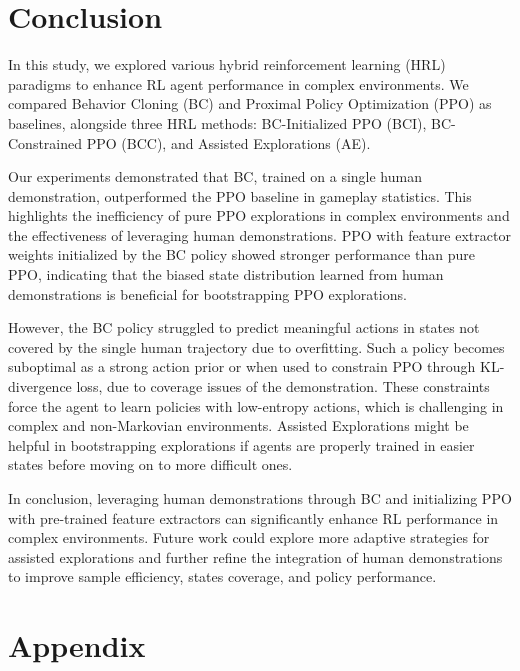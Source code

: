 \documentclass{article}
\begin{document}
\section{Conclusion}

In this study, we explored various hybrid reinforcement learning (HRL) 
paradigms to enhance RL agent performance in complex environments. We 
compared Behavior Cloning (BC) and Proximal Policy Optimization (PPO) 
as baselines, alongside three HRL methods: BC-Initialized PPO (BCI), 
BC-Constrained PPO (BCC), and Assisted Explorations (AE).

Our experiments demonstrated that BC, trained on a single human 
demonstration, outperformed the PPO baseline in gameplay statistics. 
This highlights the inefficiency of pure PPO explorations in complex 
environments and the effectiveness of leveraging human demonstrations. 
PPO with feature extractor weights initialized by the BC policy 
showed stronger performance than pure PPO, indicating that the biased 
state distribution learned from human demonstrations is beneficial 
for bootstrapping PPO explorations.

However, the BC policy struggled to predict meaningful actions in 
states not covered by the single human trajectory due to overfitting. 
Such a policy becomes suboptimal as a strong action prior or when 
used to constrain PPO through KL-divergence loss, due to coverage 
issues of the demonstration. These constraints force the agent to 
learn policies with low-entropy actions, which is challenging in 
complex and non-Markovian environments. Assisted Explorations might 
be helpful in bootstrapping explorations if agents are properly 
trained in easier states before moving on to more difficult ones.

In conclusion, leveraging human demonstrations through BC and 
initializing PPO with pre-trained feature extractors can significantly 
enhance RL performance in complex environments. Future work could 
explore more adaptive strategies for assisted explorations and further 
refine the integration of human demonstrations to improve sample 
efficiency, states coverage, and policy performance.




\clearpage
\appendix
\renewcommand{\thefigure}{A\arabic{figure}}
\renewcommand{\thetable}{A\arabic{table}}
\setcounter{figure}{0}
\setcounter{table}{0}
\onecolumn

\section{Appendix}
\end{document}
